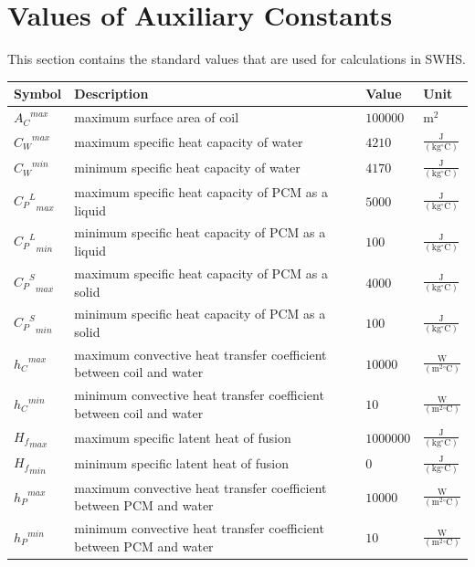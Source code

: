 \documentclass[12pt]{article}
\begin{document}
\section{Values of Auxiliary Constants}
\label{Sec:AuxConstants}
This section contains the standard values that are used for calculations in SWHS.
\begin{longtabu}{l X[l] l l}
\toprule
Symbol & Description & Value & Unit
\\
\midrule
\endhead
${{A_{C}}^{max}}$ & maximum surface area of coil & $100000$ & $\text{m}^{2}$
\\
${{C_{W}}^{max}}$ & maximum specific heat capacity of water & $4210$ & $\frac{\text{J}}{(\text{kg}{}^{\circ}\text{C})}$
\\
${{C_{W}}^{min}}$ & minimum specific heat capacity of water & $4170$ & $\frac{\text{J}}{(\text{kg}{}^{\circ}\text{C})}$
\\
${{{C_{P}}^{L}}_{max}}$ & maximum specific heat capacity of PCM as a liquid & $5000$ & $\frac{\text{J}}{(\text{kg}{}^{\circ}\text{C})}$
\\
${{{C_{P}}^{L}}_{min}}$ & minimum specific heat capacity of PCM as a liquid & $100$ & $\frac{\text{J}}{(\text{kg}{}^{\circ}\text{C})}$
\\
${{{C_{P}}^{S}}_{max}}$ & maximum specific heat capacity of PCM as a solid & $4000$ & $\frac{\text{J}}{(\text{kg}{}^{\circ}\text{C})}$
\\
${{{C_{P}}^{S}}_{min}}$ & minimum specific heat capacity of PCM as a solid & $100$ & $\frac{\text{J}}{(\text{kg}{}^{\circ}\text{C})}$
\\
${{h_{C}}^{max}}$ & maximum convective heat transfer coefficient between coil and water & $10000$ & $\frac{\text{W}}{(\text{m}^{2}{}^{\circ}\text{C})}$
\\
${{h_{C}}^{min}}$ & minimum convective heat transfer coefficient between coil and water & $10$ & $\frac{\text{W}}{(\text{m}^{2}{}^{\circ}\text{C})}$
\\
${{H_{f}}_{max}}$ & maximum specific latent heat of fusion & $1000000$ & $\frac{\text{J}}{(\text{kg}{}^{\circ}\text{C})}$
\\
${{H_{f}}_{min}}$ & minimum specific latent heat of fusion & $0$ & $\frac{\text{J}}{(\text{kg}{}^{\circ}\text{C})}$
\\
${{h_{P}}^{max}}$ & maximum convective heat transfer coefficient between PCM and water & $10000$ & $\frac{\text{W}}{(\text{m}^{2}{}^{\circ}\text{C})}$
\\
${{h_{P}}^{min}}$ & minimum convective heat transfer coefficient between PCM and water & $10$ & $\frac{\text{W}}{(\text{m}^{2}{}^{\circ}\text{C})}$

\end{longtabu}
\end{document}
